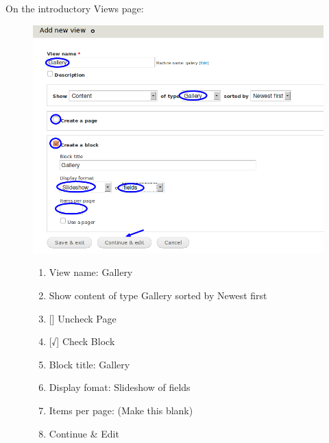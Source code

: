 \documentclass[letterpaper,10pt,english]{sphinxmanual}
\begin{document}
On the introductory Views page:
\begin{figure}[htbp]
\centering

\includegraphics[width=0.650\linewidth]{slideshows-gallery-intro.png}
{\small \begin{enumerate}
\item {} 
View name: Gallery

\item {} 
Show content of type Gallery sorted by Newest first

\item {} 
{[}{]} Uncheck Page

\item {} 
{[}√{]} Check Block

\item {} 
Block title: Gallery

\item {} 
Display fomat: Slideshow of fields

\item {} 
Items per page: (Make this blank)

\item {} 
Continue \& Edit

\end{enumerate}
}\end{figure}
\end{document}
